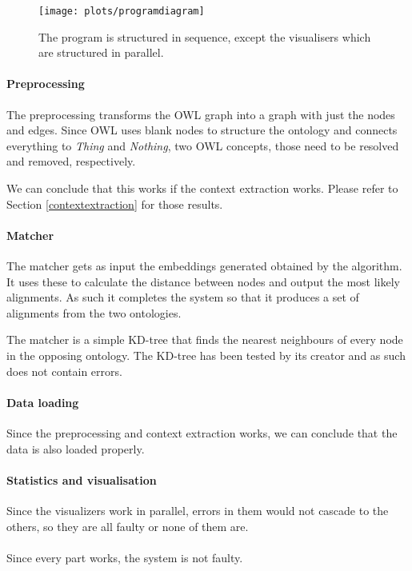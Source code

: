 \documentclass{article}
\begin{document}
  \begin{figure}[H]
  \centering
  \texttt{[image: plots/programdiagram]}
  \label{program}
  \caption[Program diagram]{The program is structured in sequence, except the visualisers which are structured in parallel.}
  \end{figure}
  
  \paragraph{Preprocessing} \label{preprocessing}
  The preprocessing transforms the OWL graph into a graph with just the nodes and edges. Since OWL uses blank nodes to structure the ontology and connects everything to \textit{Thing} and \textit{Nothing}, two OWL concepts, those need to be resolved and removed, respectively.
  
  We can conclude that this works if the context extraction works. Please refer to Section \ref{contextextraction} for those results.
  \paragraph{Matcher} The matcher gets as input the embeddings generated obtained by the algorithm. It uses these to calculate the distance between nodes and output the most likely alignments. As such it completes the system so that it produces a set of alignments from the two ontologies.
  
  The matcher is a simple KD-tree that finds the nearest neighbours of every node in the opposing ontology. The KD-tree has been tested by its creator and as such does not contain errors.
  \paragraph{Data loading}
  Since the preprocessing and context extraction works, we can conclude that the data is also loaded properly.
  \paragraph{Statistics and visualisation}
  Since the visualizers work in parallel, errors in them would not cascade to the others, so they are all faulty or none of them are.
  \paragraph{}
  Since every part works, the system is not faulty.
  
\end{document}
